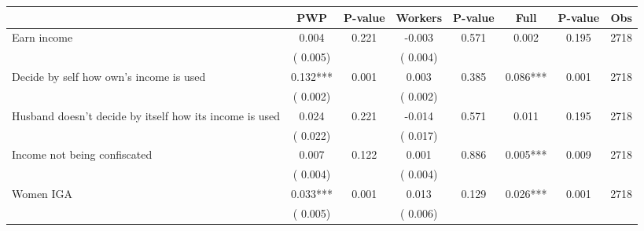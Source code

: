 
\begin{tabular}{l*{7}{c}}\hline&\multicolumn{1}{c}{PWP}&\multicolumn{1}{c}{P-value}&\multicolumn{1}{c}{Workers}&\multicolumn{1}{c}{P-value}&\multicolumn{1}{c}{Full}&\multicolumn{1}{c}{P-value}&\multicolumn{1}{c}{Obs} \\ \hline

 Earn income       &              0.004       &        0.221  &             -0.003       &        0.571  &              0.002       &              0.195 &  2718 \\ 
                       &       (       0.005)             &                               &       (       0.004)                     &                               &                                               &                                &                      \\ 

 Decide by self how own's income is used       &              0.132***       &        0.001  &              0.003       &        0.385  &              0.086***       &              0.001 &  2718 \\ 
                       &       (       0.002)             &                               &       (       0.002)                     &                               &                                               &                                &                      \\ 

 Husband doesn't decide by itself how its income is used       &              0.024       &        0.221  &             -0.014       &        0.571  &              0.011       &              0.195 &  2718 \\ 
                       &       (       0.022)             &                               &       (       0.017)                     &                               &                                               &                                &                      \\ 

 Income not being confiscated       &              0.007       &        0.122  &              0.001       &        0.886  &              0.005***       &              0.009 &  2718 \\ 
                       &       (       0.004)             &                               &       (       0.004)                     &                               &                                               &                                &                      \\ 

 Women IGA       &              0.033***       &        0.001  &              0.013       &        0.129  &              0.026***       &              0.001 &  2718 \\ 
                       &       (       0.005)             &                               &       (       0.006)                     &                               &                                               &                                &                      \\ 

\hline \end{tabular}